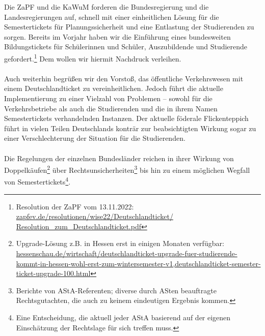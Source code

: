 \documentclass[DIV=calc]{scrartcl}
\begin{document}
Die ZaPF und die KaWuM forderen die Bundesregierung und die Landesregierungen auf, schnell mit einer einheitlichen Lösung für die Semestertickets für Planungssicherheit und eine Entlastung der Studierenden zu sorgen.
Bereits im Vorjahr haben wir die Einführung eines bundesweiten Bildungstickets für Schülerinnen und Schüler, Auszubildende und Studierende gefordert.\footnote{Resolution der ZaPF vom 13.11.2022: \href{https://zapfev.de/resolutionen/wise22/Deutschlandticket/Resolution\_zum\_Deutschlandticket.pdf}{zapfev.de/resolutionen/wise22/Deutschlandticket/\\Resolution\_zum\_Deutschlandticket.pdf}} Dem wollen wir hiermit Nachdruck verleihen.\\\\
%
Auch weiterhin begrüßen wir den Vorstoß, das öffentliche Verkehrswesen mit einem Deutschlandticket zu vereinheitlichen. Jedoch führt die aktuelle Implementierung zu einer Vielzahl von Problemen -- sowohl für die Verkehrsbetriebe als auch die Studierenden und die in ihrem Namen Semestertickets verhandelnden Instanzen. Der aktuelle föderale Flickenteppich führt in vielen Teilen Deutschlands konträr zur beabsichtigten Wirkung sogar zu einer Verschlechterung der Situation für die Studierenden.\\\\
%
Die Regelungen der einzelnen Bundesländer reichen in ihrer Wirkung von Doppelkäufen\footnote{Upgrade-Lösung z.B. in Hessen erst in einigen Monaten verfügbar: \href{https://www.hessenschau.de/wirtschaft/deutschlandticket-upgrade-fuer-studierende-kommt-in-hessen-wohl-erst-zum-wintersemester-v1,deutschlandticket-semester-ticket-upgrade-100.html}{hessenschau.de/wirtschaft/deutschlandticket-upgrade-fuer-studierende-kommt-in-hessen-wohl-erst-zum-wintersemester-v1,deutschlandticket-semester-ticket-upgrade-100.html}} über Rechtsunsicherheiten\footnote{Berichte von AStA-Referenten; diverse durch ASten beauftragte Rechtsgutachten, die auch zu keinem eindeutigen Ergebnis kommen.} bis hin zu einem möglichen Wegfall von Semestertickets\footnote{Eine Entscheidung, die aktuell jeder AStA basierend auf der eigenen Einschätzung der Rechtslage für sich treffen muss.}.\\
%
\end{document}
